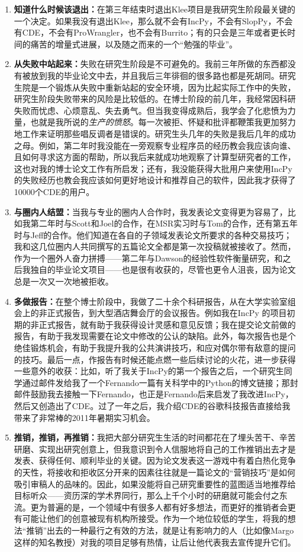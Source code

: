 \documentclass[letter,12pt]{book}
\begin{document}
\begin{CJK}{UTF8}{gbsn}
\begin{enumerate}
  \item \textbf{知道什么时候该退出：}在第三年结束时退出Klee项目是我研究生阶段最关键的一个决定。如果我没有退出Klee，那么就不会有IncPy，不会有SlopPy，不会有CDE，不会有ProWrangler，也不会有Burrito；有的只会是三年或者更长时间的痛苦的增量式进展，以及随之而来的一个“勉强的毕业”。
  \item \textbf{从失败中站起来：}失败在研究生阶段是不可避免的。我前三年所做的东西都没有被放到我的毕业论文中去，并且我后三年徘徊的很多路也都是死胡同。研究生院是一个锻炼从失败中重新站起的安全环境，因为比起实际工作中的失败，研究生阶段失败带来的风险是比较低的。在博士阶段的前几年，我经常因科研失败而忧虑、心烦意乱、失去勇气。但当我变得成熟后，我学会了化悲愤为力量，也就是我所说的\emph{生产的愤怒}。每一次被拒、怀疑和批评都鞭策我更加努力地工作来证明那些唱反调者是错误的。研究生头几年的失败是我后几年的成功之母。例如，第二年时我没能在一旁观察专业程序员的经历教会我应该向谁、且如何寻求这方面的帮助，所以我后来就成功地观察了计算型研究者的工作，这也对我的博士论文工作有所启发；还有，我没能获得大批用户来使用IncPy的失败经历也教会我应该如何更好地设计和推荐自己的软件，因此我才获得了10000个CDE的用户。
  \item \textbf{与圈内人结盟：}当我与专业的圈内人合作时，我发表论文变得更为容易了，比如我第二年时与Scott和Joel的合作，在MSR实习时与Tom的合作，还有第五年时与Jeff的合作。他们知道在各自的子领域发表论文所要求的各种交易技巧；我和这几位圈内人共同撰写的五篇论文全都是第一次投稿就被接收了。然而，作为一个圈外人奋力拼搏——第二年与Dawson的经验性软件衡量研究，和之后我独自的毕业论文项目——也是很有收获的，尽管也更令人沮丧，因为论文总是一次又一次地被拒收。
  \item \textbf{多做报告：}在整个博士阶段中，我做了二十余个科研报告，从在大学实验室组会上的非正式报告，到大型酒店舞会厅的会议报告。例如我在IncPy 的项目初期的非正式报告，就有助于我获得设计灵感和意见反馈；我在提交论文前做的报告，有助于我发现需要在论文中修改的公认的缺陷。此外，每次报告也是个绝佳锻炼机会，有助于我提升我的公共演讲技巧，和应对偶尔带有敌意的提问的技巧。最后一点，作报告有时候还能点燃一些后续讨论的火花，进一步获得一些意外的收获：比如，听了我关于IncPy的第一个报告之后，一个研究生同学通过邮件发给我了一个Fernando一篇有关科学中的Python的博文链接；那封邮件鼓励我去接触一下Fernando，也正是Fernando后来启发了我改进IncPy，然后又创造出了CDE。过了一年之后，我介绍CDE的谷歌科技报告直接给我带来了非常棒的2011年暑期实习机会。
  \item \textbf{推销，推销，再推销：}我把大部分研究生生活的时间都花在了埋头苦干、辛苦研磨、实现出研究创意上，但我意识到令人信服地将自己的工作推销出去才是发表、获得任何、顺利毕业的关键。因为论文发表这一游戏中有着白热化竞争的天性，将接收和拒收区分开来的因素往往就是一篇论文的“营销技巧”是如何吸引审稿人的品味的。因此，如果没能将自己研究重要性的蓝图适当地推荐给目标听众——资历深的学术界同行，那么上千个小时的研磨就可能会付之东流。更为普遍的是，一个领域中有很多人都有好多想法，而更好的推销者会更有可能让他们的创意被现有机构所接受。作为一个地位较低的学生，将我的想法“推销”出去的一种最行之有效的方法，就是让有影响力的人（比如像Margo 这样的知名教授）对我的项目足够有热情，让后让他代表我去宣传提升它们。

\end{enumerate}
\end{CJK}
\end{document}
